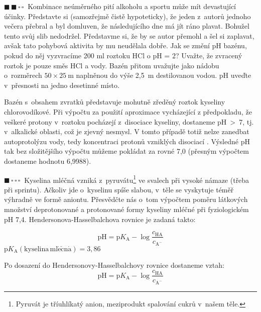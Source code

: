 \documentclass{book}
\let\ch\undefined
\newcommand{\jeden}{$\blacksquare \, \square \, \square \, \square \; \; $}
\newcommand{\dva}{$\blacksquare \, \blacksquare \, \square \, \square \; \; $}
\renewenvironment{quotation}{\par}{\par} %
\begin{document}
\hrulefill
\begin{quotation}
\dva Kombinace neúměrného pití alkoholu a sportu může mít devastující účinky.
Představte si (samozřejmě čistě hypoteticky), že jeden z~autorů jednoho
večera přebral a byl domluven, že následujícího dne má jít ráno plavat.
Bohužel tento svůj slib nedodržel. Představme si, že by se autor přemohl
a šel si zaplavat, avšak tato pohybová aktivita by mu neudělala dobře.
Jak se změní pH bazénu, pokud do něj vyzvracíme 200 ml roztoku HCl
o pH = 2? Uvažte, že zvracený roztok je pouze směs HCl a vody. Bazén
přitom uvažujte jako nádobu o~rozměrech $50\times25~\mathrm{m}$ naplněnou do výše
2,5~m destilovanou vodou. pH uveďte v~přesnosti na jedno desetinné
místo. 
\end{quotation} \dotfill \par 
Bazén s~obsahem zvratků představuje mohutně zředěný roztok
kyseliny chlorovodíkové. Při výpočtu za použití aproximace vycházející
z předpokladu, že veškeré protony v~roztoku pocházejí z~disociace
kyseliny, dostaneme pH~>~7, tj. v~alkalické oblasti, což je zjevný nesmysl.
V tomto případě totiž nelze zanedbat autoprotolýzu vody, tedy koncentraci
protonů vzniklých disociací \shorthandoff{-}
\ch{2 H2O -> H3O^{+} + OH^{-}}
\shorthandon{-}.
Výsledné pH tak bez složitějšího výpočtu můžeme pokládat za rovné
7,0 (přesným výpočtem dostaneme hodnotu 6,9988). 

\hrulefill %
\begin{quotation}
\jeden Kyselina mléčná vzniká z~pyruvátu\footnote{Pyruvát je tříuhlíkatý anion, meziprodukt spalování cukrů v~našem těle.} ve svalech při vysoké námaze (třeba při sprintu). Ačkoliv jde o~kyselinu spíše slabou, v~těle se vyskytuje
téměř výhradně ve formě aniontu. Přesvědčte nás o~tom výpočtem 
poměru látkových množství deprotonované a protonované formy kyseliny mléčné při fyziologickém
pH 7,4. Hendersonova-Hasselbalchova rovnice je zadaná takto:

\[
\mathrm{pH=p}K_{\mathrm{A}}-\log\frac{c_{\mathrm{HA}}}{c_{\mathrm{A^{-}}}}
\]
$\mathrm{p}K_{\mathrm{A}}(\mathrm{kyselina\,ml\acute{e}\check{c}n\acute{a}})=3,86$
\end{quotation} \dotfill \par 
Po dosazení do Hendersonovy-Hasselbalchovy rovnice dostaneme vztah:
\[
\mathrm{pH}=\mathrm{p}K_{\mathrm{A}}-\log\frac{c_{\mathrm{HA}}}{c_{\mathrm{A^{-}}}}
\]
 
\end{document}

